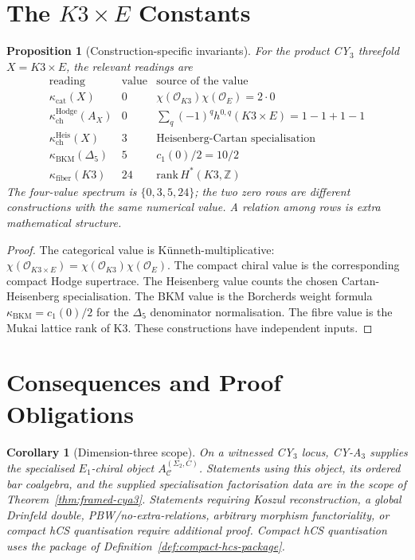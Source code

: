 \documentclass[11pt]{article}
\newtheorem{proposition}[theorem]{Proposition}
\newtheorem{corollary}[theorem]{Corollary}
\begin{document}
\section{The $K3\times E$ Constants}
\label{sec:k3e}

\begin{proposition}[Construction-specific invariants]
\label{prop:k3e-constants}
For the product CY$_3$ threefold $X=K3\times E$, the relevant readings
are
\[
\begin{array}{c|c|c}
\text{reading} & \text{value} & \text{source of the value}\\
\hline
\kappa_{\mathrm{cat}}(X) & 0 &
\chi(\mathcal O_{K3})\chi(\mathcal O_E)=2\cdot 0\\
\kappa_{\mathrm{ch}}^{\mathrm{Hodge}}(A_X) & 0 &
\sum_q(-1)^q h^{0,q}(K3\times E)=1-1+1-1\\
\kappa_{\mathrm{ch}}^{\mathrm{Heis}}(X) & 3 &
\text{Heisenberg-Cartan specialisation}\\
\kappa_{\mathrm{BKM}}(\Delta_5) & 5 &
c_1(0)/2=10/2\\
\kappa_{\mathrm{fiber}}(K3) & 24 &
\mathrm{rank}\,H^*(K3,\mathbb Z)
\end{array}
\]
The four-value spectrum is $\{0,3,5,24\}$; the two zero rows are
different constructions with the same numerical value.  A relation
among rows is extra mathematical structure.
\end{proposition}

\begin{proof}
The categorical value is K\"unneth-multiplicative:
$\chi(\mathcal O_{K3\times E})=\chi(\mathcal O_{K3})\chi(\mathcal O_E)$.
The compact chiral value is the corresponding compact Hodge supertrace.
The Heisenberg value counts the chosen Cartan-Heisenberg
specialisation.
The BKM value is the Borcherds weight formula
$\kappa_{\mathrm{BKM}}=c_1(0)/2$ for the $\Delta_5$ denominator
normalisation.  The fibre value is the Mukai lattice rank of K3.
These constructions have independent inputs.
\end{proof}

\section{Consequences and Proof Obligations}
\label{sec:obligations}

\begin{corollary}[Dimension-three scope]
\label{cor:d3-scope}
On a witnessed CY$_3$ locus, CY-A$_3$ supplies the specialised
$E_1$-chiral object
$A_{\mathcal C}^{(\Sigma_2,C)}$.  Statements using this object, its
ordered bar coalgebra, and the supplied specialisation factorisation
data are in the scope of Theorem~\ref{thm:framed-cya3}.
Statements requiring Koszul reconstruction, a global Drinfeld double,
PBW/no-extra-relations, arbitrary morphism functoriality, or compact
hCS quantisation require additional proof.  Compact hCS quantisation
uses the package of Definition~\ref{def:compact-hcs-package}.
\end{corollary}
\end{document}
